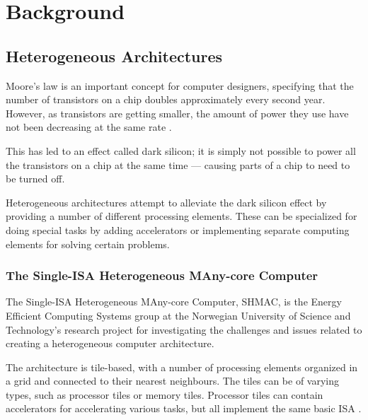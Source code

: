 \chapter{Background}

\section{Heterogeneous Architectures}
\label{sec:heterogeneous}

Moore's law is an important concept for computer designers, specifying that the
number of transistors on a chip doubles approximately every second year. However,
as transistors are getting smaller, the amount of power they use have not been
decreasing at the same rate \cite{dark-silicon}.

This has led to an effect called dark silicon; it is simply not possible to
power all the transistors on a chip at the same time --- causing parts of
a chip to need to be turned off.

Heterogeneous architectures attempt to alleviate the dark silicon effect by
providing a number of different processing elements. These can be specialized for
doing special tasks by adding accelerators or implementing separate computing
elements for solving certain problems.

\subsection{The Single-ISA Heterogeneous MAny-core Computer}
\label{sec:shmac}
The Single-ISA Heterogeneous MAny-core Computer, SHMAC, is the Energy Efficient Computing Systems group
at the Norwegian University of Science and Technology's research project for investigating the
challenges and issues related to creating a heterogeneous computer architecture.

The architecture is tile-based, with a number of processing elements organized
in a grid and connected to their nearest neighbours. The tiles can be of varying
types, such as processor tiles or memory tiles. Processor tiles can contain
accelerators for accelerating various tasks, but all implement the same basic
ISA \cite{shmac-plan}.

%
%

